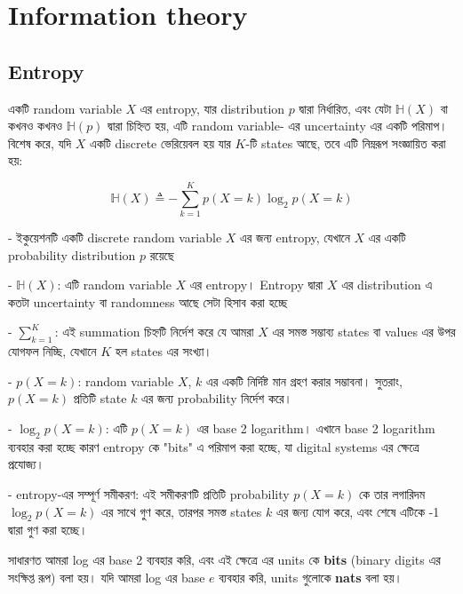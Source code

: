\documentclass[graybox, envcountchap, twocolumn]{styles/svmult}
\begin{document}
{\section{Information theory}

\subsection{Entropy}
\label{sec:Entropy}
{\bengalifont একটি random variable $X$ এর entropy, যার distribution $p$ দ্বারা নির্ধারিত, এবং যেটা $\mathbb{H}(X)$ বা কখনও কখনও $\mathbb{H}(p)$ দ্বারা চিহ্নিত হয়, এটি random variable- এর  uncertainty এর একটি পরিমাপ। বিশেষ করে, যদি $X$ একটি discrete ভেরিয়েবল হয় যার $K$-টি states আছে, তবে এটি নিম্নরূপ সংজ্ঞায়িত করা হয়:}

\begin{equation}
\mathbb{H}(X) \triangleq -\sum\limits_{k=1}^{K}{p(X=k)\log_2p(X=k)}
\end{equation}

\bengalifont
-    ইকুয়েশনটি একটি discrete random variable $X$ এর জন্য entropy, যেখানে $X$ এর একটি probability distribution $p$ রয়েছে

-   $\mathbb{H}(X)$: {\bengalifont এটি random variable $X$ এর entropy। Entropy দ্বারা $X$ এর distribution এ কতটা uncertainty বা randomness আছে সেটা হিসাব করা হচ্ছে }

-   $\sum\limits_{k=1}^{K}$: {\bengalifont এই summation চিহ্নটি নির্দেশ করে যে আমরা $X$ এর সমস্ত সম্ভাব্য states বা values এর উপর যোগফল নিচ্ছি, যেখানে $K$ হল states এর সংখ্যা।}

-   $p(X=k)$: {\bengalifont random variable $X$, $k$ এর একটি নির্দিষ্ট মান গ্রহণ করার সম্ভাবনা।  সুতরাং, $p(X=k)$ প্রতিটি state $k$ এর জন্য probability নির্দেশ করে।}

- $\log_2 p(X=k)$: {\bengalifont এটি $p(X=k)$ এর base 2 logarithm। এখানে base 2 logarithm ব্যবহার করা হচ্ছে কারণ entropy কে "bits" এ পরিমাপ করা হচ্ছে, যা digital systems এর ক্ষেত্রে প্রযোজ্য।}

- {\bengalifont entropy-এর সম্পূর্ণ সমীকরণ}: {\bengalifont এই সমীকরণটি প্রতিটি probability $p(X=k)$ কে তার লগারিদম $\log_2 p(X=k)$ এর সাথে গুণ করে, তারপর সমস্ত states $k$ এর জন্য যোগ করে, এবং শেষে এটিকে -1 দ্বারা গুণ করা হচ্ছে।}




{\bengalifont সাধারণত আমরা log এর base 2 ব্যবহার করি, এবং এই ক্ষেত্রে এর units কে \textbf{bits} (binary digits এর সংক্ষিপ্ত রূপ) বলা হয়। যদি আমরা log এর base $e$ ব্যবহার করি, units গুলোকে \textbf{nats} বলা হয়।}

}
\end{document}
